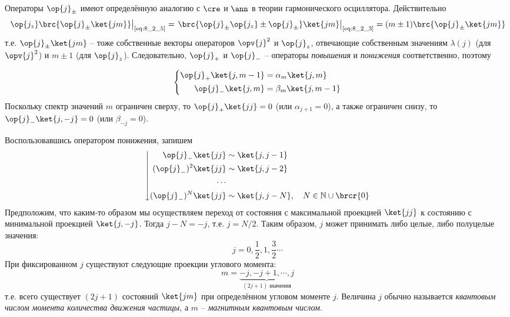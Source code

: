 Операторы $\op{j}_{\pm}$ имеют определённую аналогию с $\cre$ и $\ann$ в теории гармонического осциллятора. Действительно
$$
\left. \op{j_z} \brc{\op{j}_{\pm} \ket{jm}} \right|_{\text{\eqref{eq:8_2_5}}}
= \left. \brc{\op{j}_{\pm} \op{j_z} \pm \op{j}_{\pm}} \ket{jm} \right|_{\text{\eqref{eq:8_2_3}}}
= (m \pm 1) \brc{\op{j}_{\pm} \ket{jm}}
$$%
%
т.е. $\op{j}_{\pm} \ket{jm}$ -- тоже собственные векторы операторов $\opv{j}^2$ и $\op{j}_z$, отвечающие собственным значениям $\lambda(j)$ (для $\opv{j}^2$) и $m \pm 1$ (для $\op{j}_z$). Следовательно, $\op{j}_{+}$ и $\op{j}_{-}$ -- операторы {\em повышения} и {\em понижения} соответственно, поэтому

\begin{equation}
\label{eq:8_2_6}
\left\{
\begin{aligned}
\op{j}_{+} \ket{j, m-1} &= \alpha_m \ket{j, m}\\
\op{j}_{-} \ket{j, m} &= \beta_m \ket{j, m-1}\\
\end{aligned}
\right.
\end{equation}%
%
Поскольку спектр значений $m$ ограничен сверху, то $\op{j}_{+} \ket{jj} = 0$ (или $\alpha_{j+1} = 0$), а также ограничен снизу, то $\op{j}_{-} \ket{j, -j} = 0$ (или $\beta_{-j} = 0$).

Воспользовавшись оператором понижения, запишем
$$
\left\downarrow
\begin{aligned}
\op{j}_{-} \ket{jj} & \sim \ket{j, j-1}\\
(\op{j}_{-})^2 \ket{jj} & \sim \ket{j, j-2}\\
\cdots \\
(\op{j}_{-})^N \ket{jj} & \sim \ket{j, j-N},~~~N \in \mathbb{N} \cup \brcr{0} \\
\end{aligned}
\right.
$$%
%
Предположим, что каким-то образом мы осуществляем переход от состояния с максимальной проекцией $\ket{jj}$ к состоянию с минимальной проекцией $\ket{j, -j}$. Тогда $j - N = -j$, т.е. $j = N/2$. Таким образом, $j$ может принимать либо целые, либо полуцелые значения:
$$
j = 0, \frac{1}{2}, 1, \frac{3}{2} \cdots
$$%
%
При фиксированном $j$ существуют следующие проекции углового момента:
$$
m = \underbrace{-j, -j + 1, \cdots, j}_{(2j + 1)~\text{значения}}
$$%
%
т.е. всего существует $(2j+1)$ состояний $\ket{jm}$ при определённом угловом моменте $j$. Величина $j$ обычно называется {\em квантовым числом момента количества движения частицы}, а $m$ -- {\em магнитным квантовым числом}.

